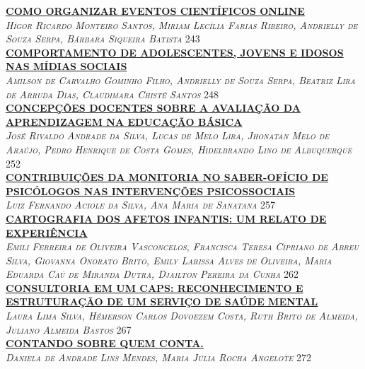 \noindent \textsc{\hyperlink{trabalhos/251733.pdf.1}{\textbf{COMO ORGANIZAR EVENTOS CIENTÍFICOS ONLINE}}}\\ 
\noindent \textsc{\textit{Hígor Ricardo Monteiro Santos, Miriam Lecília Farias Ribeiro, Andrielly de Souza Serpa, Bárbara Siqueira Batista}} \hfill 243\\ 

\noindent \textsc{\hyperlink{trabalhos/251181.pdf.1}{\textbf{COMPORTAMENTO DE ADOLESCENTES, JOVENS E IDOSOS NAS MÍDIAS SOCIAIS}}}\\ 
\noindent \textsc{\textit{Amilson de Carvalho Gominho Filho, Andrielly de Souza Serpa, Beatriz Lira de Arruda Dias, Claudimara Chisté Santos}} \hfill 248\\ 

\noindent \textsc{\hyperlink{trabalhos/249748.pdf.1}{\textbf{CONCEPÇÕES DOCENTES SOBRE A AVALIAÇÃO DA APRENDIZAGEM NA EDUCAÇÃO BÁSICA}}}\\ 
\noindent \textsc{\textit{José Rivaldo Andrade da Silva, Lucas de Melo Lira, Jhonatan Melo de Araújo, Pedro Henrique de Costa Gomes, Hidelbrando Lino de Albuquerque}} \hfill 252\\ 

\noindent \textsc{\hyperlink{trabalhos/250362.pdf.1}{\textbf{CONTRIBUIÇÕES DA MONITORIA NO SABER-OFÍCIO DE PSICÓLOGOS NAS INTERVENÇÕES PSICOSSOCIAIS}}}\\ 
\noindent \textsc{\textit{Luiz Fernando Aciole da Silva, Ana Maria de Sanatana}} \hfill 257\\ 

\noindent \textsc{\hyperlink{trabalhos/251702.pdf.1}{\textbf{CARTOGRAFIA DOS AFETOS INFANTIS: UM RELATO DE EXPERIÊNCIA}}}\\ 
\noindent \textsc{\textit{Emili Ferreira de Oliveira Vasconcelos, Francisca Teresa Cipriano de Abreu Silva, Giovanna Onorato Brito, Emily Larissa Alves de Oliveira, Maria Eduarda Caú de Miranda Dutra, Djailton Pereira da Cunha}} \hfill 262\\ 

\noindent \textsc{\hyperlink{trabalhos/250188.pdf.1}{\textbf{CONSULTORIA EM UM CAPS: RECONHECIMENTO E ESTRUTURAÇÃO DE UM SERVIÇO DE SAÚDE MENTAL }}}\\ 
\noindent \textsc{\textit{Laura Lima Silva, Hémerson Carlos Dovoezem Costa, Ruth Brito de Almeida, Juliano Almeida Bastos}} \hfill 267\\ 

\noindent \textsc{\hyperlink{trabalhos/251863.pdf.1}{\textbf{CONTANDO SOBRE QUEM CONTA.}}}\\ 
\noindent \textsc{\textit{Daniela de Andrade Lins Mendes, Maria Júlia Rocha Angelote}} \hfill 272\\ 


